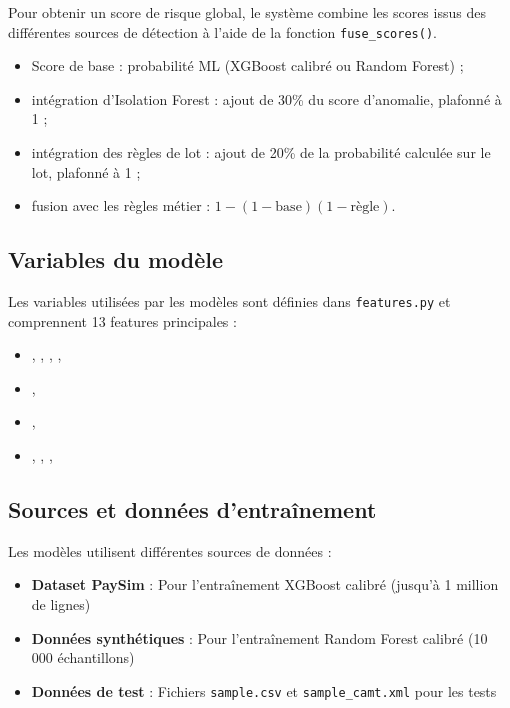\documentclass[12pt,a4paper]{extreport}
\begin{document}
Pour obtenir un score de risque global, le système combine les scores issus des différentes sources de détection à l’aide de la fonction \texttt{fuse\_scores()}.
\begin{itemize}
    \item Score de base : probabilité ML (XGBoost calibré ou Random Forest) ;
    \item intégration d'Isolation Forest : ajout de 30\% du score d'anomalie, plafonné à 1 ;
    \item intégration des règles de lot : ajout de 20\% de la probabilité calculée sur le lot, plafonné à 1 ;
    \item fusion avec les règles métier : \(1-(1-\text{base})(1-\text{règle})\).
\end{itemize}

\subsection{Variables du modèle}

Les variables utilisées par les modèles sont définies dans \texttt{features.py} et comprennent 13 features principales :
\begin{itemize}
    \item {}, , , , 
    \item {}, 
    \item {}, 
    \item {}, , , 
\end{itemize}

\subsection{Sources et données d'entraînement}

Les modèles utilisent différentes sources de données :
\begin{itemize}
    \item \textbf{Dataset PaySim} : Pour l'entraînement XGBoost calibré (jusqu'à 1 million de lignes)
    \item \textbf{Données synthétiques} : Pour l'entraînement Random Forest calibré (10 000 échantillons)
    \item \textbf{Données de test} : Fichiers \texttt{sample.csv} et \texttt{sample\_camt.xml} pour les tests
\end{itemize}
\end{document}
